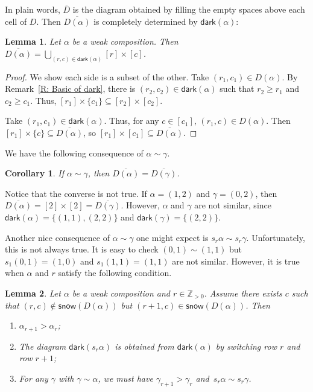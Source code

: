 \documentclass[10pt]{amsart}
\theoremstyle{plain}
\newtheorem{cor}[cor]{Corollary}
\theoremstyle{plain}
\theoremstyle{definition}
\theoremstyle{definition}
\theoremstyle{definition}
\theoremstyle{plain}
\theoremstyle{plain}
\theoremstyle{plain}
\newtheorem{lemma}[lemma]{Lemma}
\theoremstyle{plain}
\theoremstyle{plain}
\theoremstyle{remark}
\theoremstyle{remark}
\theoremstyle{plain}
\theoremstyle{plain}
\newcommand{\Z}{\mathbb{Z}}
\newcommand{\dark}{\mathsf{dark}}
\newcommand{\snow}{\mathsf{snow}}
\begin{document}
In plain words, $\overline{D}$ is the diagram obtained
by filling the empty spaces above each cell of $D$.
Then $\overline{D(\alpha)}$ is completely determined 
by $\dark(\alpha)$:
\begin{lemma}
Let $\alpha$ be a weak composition.
Then $\overline{D(\alpha)} = \bigcup_{(r,c) \in \dark(\alpha)} [r] \times [c]$.
\end{lemma}
\begin{proof}
We show each side is a subset of the other. 
Take $(r_1,c_1) \in D(\alpha)$. 
By Remark~\ref{R: Basic of dark},
there is $(r_2, c_2) \in \dark(\alpha)$ such that 
$r_2 \geqslant r_1$ and $c_2 \geqslant c_1$.
Thus, $[r_1] \times \{c_1\} \subseteq [r_2] \times [c_2]$.

Take $(r_1,c_1) \in \dark(\alpha)$.
Thus, for any $c \in [c_1]$, 
$(r_1,c) \in D(\alpha)$.
Then $[r_1] \times \{c\} \subseteq \overline{D(\alpha)}$,
so $[r_1] \times [c_1] \subseteq \overline{D(\alpha)}$. 
\end{proof}

We have the following consequence of 
$\alpha \sim \gamma$.

\begin{cor}
\label{C: sim implies same overline}
If $\alpha \sim \gamma$,
then $\overline{D(\alpha)} = \overline{D(\gamma)}$.
\end{cor}
Notice that the converse is not true. 
If $\alpha = (1,2)$ and $\gamma = (0,2)$,
then $\overline{D(\alpha)} = [2] \times [2]
=  \overline{D(\gamma)}$.
However, $\alpha$ and $\gamma$ are not similar,
since $\dark(\alpha) = \{ (1,1), (2,2)\}$
and $\dark(\gamma) = \{(2,2)\}$.

Another nice consequence of $\alpha \sim \gamma$ one might expect
is $s_r \alpha \sim s_r \gamma$.
Unfortunately, this is not always true. 
It is easy to check $(0,1) \sim (1,1)$
but $s_1(0,1) = (1,0)$  and $s_1(1,1) = (1,1)$ are not similar. 
However, it is true
when $\alpha$ and $r$ satisfy 
the following condition.

\begin{lemma}
\label{L: s_i fix sim}
Let $\alpha$ be a weak composition and $r\in \Z_{>0}$.
Assume there exists $c$
such that $(r, c)\notin \snow(D(\alpha))$
but $(r+1, c)\in \snow(D(\alpha))$.
Then 
\begin{enumerate}
\item[(i)] $\alpha_{r+1} > \alpha_r$;
\item[(ii)] The diagram $\dark(s_r \alpha)$
is obtained from $\dark(\alpha)$
by switching row $r$ and row $r+1$;
\item[(iii)] For any $\gamma$ with
$\gamma \sim \alpha$,
we must have $\gamma_{r+1} > \gamma_{r}$ 
and~$s_r\alpha \sim s_r\gamma$.
\end{enumerate}
\end{lemma}
\end{document}
